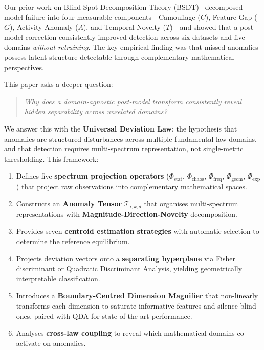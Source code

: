 \documentclass[journal]{IEEEtran}
\newcommand{\T}{\mathcal{T}}
\begin{document}
Our prior work on Blind Spot Decomposition Theory (BSDT)~\cite{odeyemi2025bsdt} decomposed model failure into four measurable components---Camouflage ($C$), Feature Gap ($G$), Activity Anomaly ($A$), and Temporal Novelty ($T$)---and showed that a post-model correction consistently improved detection across six datasets and five domains \textit{without retraining}. The key empirical finding was that missed anomalies possess latent structure detectable through complementary mathematical perspectives.

This paper asks a deeper question:

\begin{quote}
\textit{Why does a domain-agnostic post-model transform consistently reveal hidden separability across unrelated domains?}
\end{quote}

We answer this with the \textbf{Universal Deviation Law}: the hypothesis that anomalies are structured disturbances across multiple fundamental law domains, and that detection requires multi-spectrum representation, not single-metric thresholding. This framework:

\begin{enumerate}
  \item Defines five \textbf{spectrum projection operators} ($\Phi_{\text{stat}}$, $\Phi_{\text{chaos}}$, $\Phi_{\text{freq}}$, $\Phi_{\text{geom}}$, $\Phi_{\text{exp}}$) that project raw observations into complementary mathematical spaces.
  \item Constructs an \textbf{Anomaly Tensor} $\T_{i,k,d}$ that organises multi-spectrum representations with \textbf{Magnitude-Direction-Novelty} decomposition.
  \item Provides seven \textbf{centroid estimation strategies} with automatic selection to determine the reference equilibrium.
  \item Projects deviation vectors onto a \textbf{separating hyperplane} via Fisher discriminant or Quadratic Discriminant Analysis, yielding geometrically interpretable classification.
  \item Introduces a \textbf{Boundary-Centred Dimension Magnifier} that non-linearly transforms each dimension to saturate informative features and silence blind ones, paired with QDA for state-of-the-art performance.
  \item Analyses \textbf{cross-law coupling} to reveal which mathematical domains co-activate on anomalies.
\end{enumerate}
\end{document}

